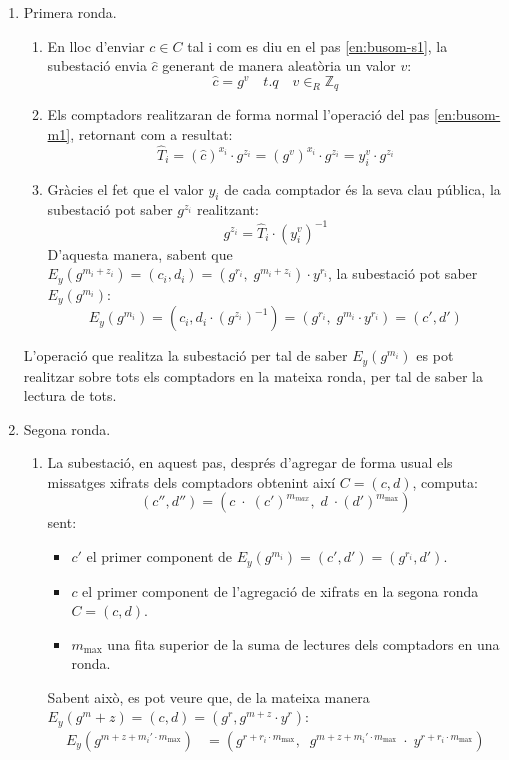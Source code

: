 \begin{enumerate}
	\item Primera ronda.
	\begin{enumerate}
		\item En lloc d'enviar $c \in C$ tal i com es diu en el pas \ref{en:busom-s1}, la subestació envia $\hat{c}$ generant de manera aleatòria un valor $v$:
		\[\hat{c} = g^v \quad t.q \quad v \in_R {\mathbb{Z}_{q}}\]
		\item Els comptadors realitzaran de forma normal l'operació del pas \ref{en:busom-m1}, retornant com a resultat:
		\[\hat{T}_i = (\hat{c})^{x_i} \cdot g^{z_i} = (g^v)^{x_i} \cdot g^{z_i} = y_i^v \cdot g^{z_i}\]
		\item Gràcies el fet que el valor $y_i$ de cada comptador és la seva clau pública, la subestació pot saber $g^{z_i}$ realitzant:
		\[g^{z_i} = \hat{T}_i \cdot (y_i^v)^{-1}\]
		D'aquesta manera, sabent que $E_y(g^{m_i + z_i}) = (c_i, d_i) = (g^{r_i}, \; g^{m_i + z_i}) \cdot y^{r_i}$, la subestació pot saber $E_y(g^{m_i})$:
		\[E_y(g^{m_i}) = (c_i, d_i \cdot (g^{z_i})^{-1}) = (g^{r_i}, \; g^{m_i} \cdot y^{r_i}) = (c', d')\]
	\end{enumerate}
	L'operació que realitza la subestació per tal de saber $E_y(g^{m_i})$ es pot realitzar sobre tots els comptadors en la mateixa ronda, per tal de saber la lectura de tots.
	\item Segona ronda.
	\begin{enumerate}
		\item La subestació, en aquest pas, després d'agregar de forma usual els missatges xifrats dels comptadors obtenint així $C = (c, d)$, computa:
		\[(c'', d'') = (c \; \cdot \; (c')^{m_{max}}, \; d \; \cdot (d')^{m_{\textrm{max}}})\]
		sent:
		\begin{itemize}
			\item $c'$ el primer component de $E_y(g^{m_i}) = (c', d') = (g^{r_i}, d')$.
			\item $c$ el primer component de l'agregació de xifrats en la segona ronda $C = (c,d)$.
			\item $m_{\textrm{max}}$ una fita superior de la suma de lectures dels comptadors en una ronda.
		\end{itemize}
		Sabent això, es pot veure que, de la mateixa manera $E_y(g^m+z) = (c, d) = (g^r, g^{m+z} \cdot y^r)$:
		\begin{align*}
		E_y(g^{m + z + m_i'\cdot m_{\textrm{max}}}) &= (g^{r + r_i \cdot m_{\textrm{max}}}, \;\; g^{m + z + m_i' \cdot m_{\textrm{max}}} \; \cdot \; y^{r + r_i \cdot m_{\textrm{max}}}) \\

\end{align*}
\end{enumerate}
\end{enumerate}

